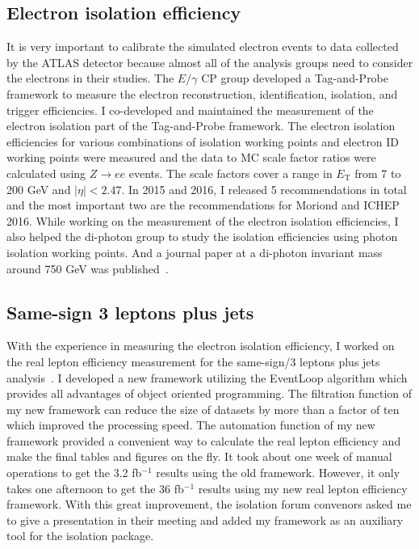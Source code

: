 \documentclass[12pt]{article}
\begin{document}
\subsection{Electron isolation efficiency}
It is very important to calibrate the simulated electron events to data collected by the ATLAS detector because almost all of the analysis groups need to consider the electrons in their studies.
The $E/\gamma$ CP group developed a Tag-and-Probe framework to measure the electron reconstruction, identification,  isolation, and trigger efficiencies.
I co-developed and maintained the measurement of the electron isolation part of the Tag-and-Probe framework.
The electron isolation efficiencies for various combinations of isolation working points and electron ID working points were measured and the data to MC scale factor ratios were calculated using $Z \to ee$ events.
The scale factors cover  a range in $E_{\textrm{T}}$ from 7 to 200 GeV and $|\eta| < 2.47$.
In 2015 and 2016, I released 5 recommendations in total and the most important two are the recommendations for Moriond and ICHEP 2016.
While working on the measurement of the electron isolation efficiencies, I also helped the di-photon group to study the isolation efficiencies using photon isolation working points.
And a journal paper at a di-photon invariant mass around 750 GeV was published~\cite{Aaboud:2016tru}.

\subsection{Same-sign 3 leptons plus jets}
With the experience in measuring the electron isolation efficiency, I worked on the real lepton efficiency measurement for the same-sign/3 leptons plus jets analysis~\cite{Aaboud:2017dmy, Aad:2016tuk}.
I developed a new framework utilizing the EventLoop algorithm which provides all advantages of object oriented programming.
The filtration function of my new framework can reduce the size of datasets by more than a factor of ten which improved the processing speed.
The automation function of my new framework provided a convenient way to calculate the real lepton efficiency and make the final tables and figures on the fly.
It took about one week of manual operations to get the 3.2 fb$^{-1}$ results using the old framework.
However, it only takes one afternoon to get the 36 fb$^{-1}$ results using my new real lepton efficiency framework.
With this great improvement, the isolation forum convenors asked me to give a presentation in their meeting and added my framework as an auxiliary tool for the isolation package.
\end{document}
